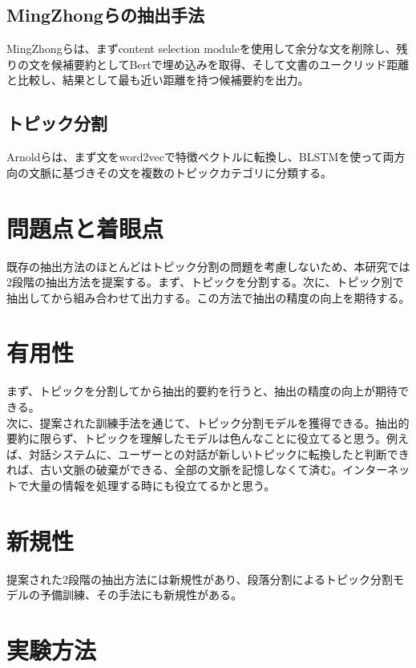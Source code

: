 \documentclass[a4paper]{article}
\begin{document}
\subsection{MingZhongらの抽出手法}

MingZhongら\cite{zhong2020extractive}は、まずcontent selection moduleを使用して余分な文を削除し、残りの文を候補要約としてBertで埋め込みを取得、そして文書のユークリッド距離と比較し、結果として最も近い距離を持つ候補要約を出力。

\subsection{トピック分割}

Arnoldら\cite{arnold2019sector}は、まず文をword2vecで特徴ベクトルに転換し、BLSTMを使って両方向の文脈に基づきその文を複数のトピックカテゴリに分類する。\\


\section{問題点と着眼点}

既存の抽出方法のほとんどはトピック分割の問題を考慮しないため、本研究では2段階の抽出方法を提案する。まず、トピックを分割する。次に、トピック別で抽出してから組み合わせて出力する。この方法で抽出の精度の向上を期待する。

\section{有用性}

まず、トピックを分割してから抽出的要約を行うと、抽出の精度の向上が期待できる。\\

次に、提案された訓練手法を通じて、トピック分割モデルを獲得できる。抽出的要約に限らず、トピックを理解したモデルは色んなことに役立てると思う。例えば、対話システムに、ユーザーとの対話が新しいトピックに転換したと判断できれば、古い文脈の破棄ができる、全部の文脈を記憶しなくて済む。インターネットで大量の情報を処理する時にも役立てるかと思う。

\section{新規性}

提案された2段階の抽出方法には新規性があり、段落分割によるトピック分割モデルの予備訓練、その手法にも新規性がある。

\section{実験方法}
\end{document}
